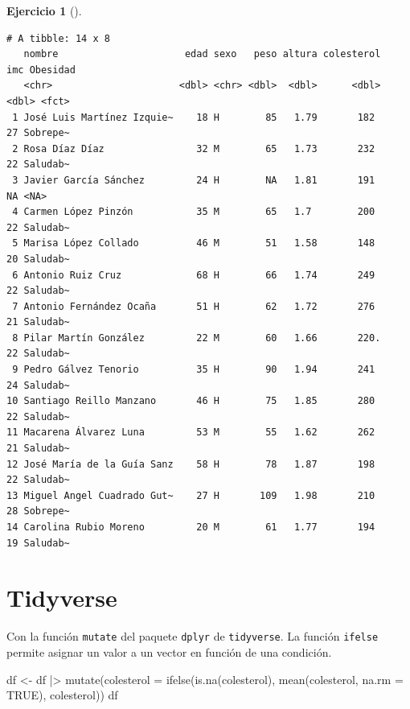\documentclass[
  a4paper,
]{scrreport}
\newenvironment{Shaded}{\begin{snugshade}}{\end{snugshade}}
\newcommand{\AttributeTok}[1]{\textcolor[rgb]{0.40,0.45,0.13}{#1}}
\newcommand{\ConstantTok}[1]{\textcolor[rgb]{0.56,0.35,0.01}{#1}}
\newcommand{\FunctionTok}[1]{\textcolor[rgb]{0.28,0.35,0.67}{#1}}
\newcommand{\NormalTok}[1]{\textcolor[rgb]{0.00,0.23,0.31}{#1}}
\newcommand{\OtherTok}[1]{\textcolor[rgb]{0.00,0.23,0.31}{#1}}
\newcommand{\SpecialCharTok}[1]{\textcolor[rgb]{0.37,0.37,0.37}{#1}}
\theoremstyle{definition}
\newtheorem{exercise}{Ejercicio}[chapter]
\theoremstyle{remark}
\begin{document}
\begin{exercise}[]
\begin{enumerate}
\begin{tcolorbox}
\begin{Shaded}
\end{Shaded}

\begin{verbatim}
# A tibble: 14 x 8
   nombre                      edad sexo   peso altura colesterol   imc Obesidad
   <chr>                      <dbl> <chr> <dbl>  <dbl>      <dbl> <dbl> <fct>   
 1 José Luis Martínez Izquie~    18 H        85   1.79       182     27 Sobrepe~
 2 Rosa Díaz Díaz                32 M        65   1.73       232     22 Saludab~
 3 Javier García Sánchez         24 H        NA   1.81       191     NA <NA>    
 4 Carmen López Pinzón           35 M        65   1.7        200     22 Saludab~
 5 Marisa López Collado          46 M        51   1.58       148     20 Saludab~
 6 Antonio Ruiz Cruz             68 H        66   1.74       249     22 Saludab~
 7 Antonio Fernández Ocaña       51 H        62   1.72       276     21 Saludab~
 8 Pilar Martín González         22 M        60   1.66       220.    22 Saludab~
 9 Pedro Gálvez Tenorio          35 H        90   1.94       241     24 Saludab~
10 Santiago Reillo Manzano       46 H        75   1.85       280     22 Saludab~
11 Macarena Álvarez Luna         53 M        55   1.62       262     21 Saludab~
12 José María de la Guía Sanz    58 H        78   1.87       198     22 Saludab~
13 Miguel Angel Cuadrado Gut~    27 H       109   1.98       210     28 Sobrepe~
14 Carolina Rubio Moreno         20 M        61   1.77       194     19 Saludab~
\end{verbatim}

  \section{Tidyverse}

  Con la función \texttt{mutate} del paquete \texttt{dplyr} de
  \texttt{tidyverse}. La función \texttt{ifelse} permite asignar un
  valor a un vector en función de una condición.

\begin{Shaded}
\begin{Highlighting}[]
\NormalTok{df }\OtherTok{\textless{}{-}}\NormalTok{ df }\SpecialCharTok{|\textgreater{}}
    \FunctionTok{mutate}\NormalTok{(}\AttributeTok{colesterol =} \FunctionTok{ifelse}\NormalTok{(}\FunctionTok{is.na}\NormalTok{(colesterol), }\FunctionTok{mean}\NormalTok{(colesterol, }\AttributeTok{na.rm =} \ConstantTok{TRUE}\NormalTok{), colesterol))}
\NormalTok{df}
\end{Highlighting}
\end{Shaded}


\end{tcolorbox}
\end{enumerate}
\end{exercise}
\end{document}
